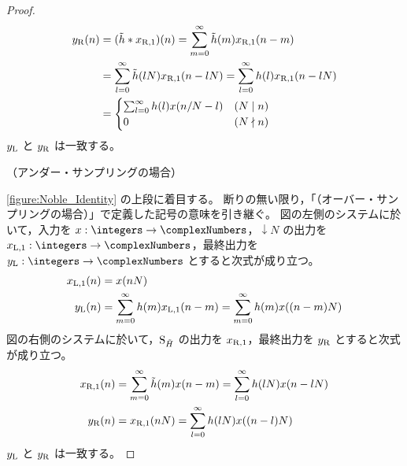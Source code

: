 \begin{proof}
\begin{align*}
                y_{\mathrm{R}}(n) &= (\tilde{h}*x_{\mathrm{R},1})(n) = \sum_{m=0}^\infty \tilde{h}(m)x_{\mathrm{R},1}(n-m) \\
                &= \sum_{l=0}^\infty \tilde{h}(lN)x_{\mathrm{R},1}(n-lN) = \sum_{l=0}^\infty h(l)x_{\mathrm{R},1}(n-lN) \\
                &= \begin{cases}
                    \sum_{l=0}^\infty h(l)x(n/N-l) & (N\mid n) \\
                    0 & (N\nmid n)
                \end{cases}
            \end{align*}
            $y_{\mathrm{L}}$ と $y_{\mathrm{R}}$ は一致する。
            \newline
            \quad\par\noindent
            （アンダー・サンプリングの場合）
            \par\noindent
            \cref{figure:Noble_Identity} の上段に着目する。
            断りの無い限り，「（オーバー・サンプリングの場合）」で定義した記号の意味を引き継ぐ。
            図の左側のシステムに於いて，入力を $x:\integers\to\complexNumbers$，$\downarrow N$ の出力を $\xLone:\integers\to\complexNumbers$，最終出力を $\yL:\integers\to\complexNumbers$ とすると次式が成り立つ。
            \begin{align*}
                x_{\mathrm{L},1}(n) &= x(nN) \\
                y_{\mathrm{L}}(n) &= \sum_{m=0}^\infty h(m)x_{\mathrm{L},1}(n-m) = \sum_{m=0}^\infty h(m)x((n-m)N)
            \end{align*}
            図の右側のシステムに於いて，$\mathrm{S}_{\tilde{H}}$ の出力を $x_{\mathrm{R},1}$，最終出力を $y_{\mathrm{R}}$ とすると次式が成り立つ。
            \begin{align*}
                x_{\mathrm{R},1}(n) &= \sum_{m=0}^\infty \tilde{h}(m)x(n-m) = \sum_{l=0}^\infty h(lN)x(n-lN) \\
                y_{\mathrm{R}}(n) &= x_{\mathrm{R},1}(nN) = \sum_{l=0}^\infty h(lN)x((n-l)N)
            \end{align*}
            $y_{\mathrm{L}}$ と $y_{\mathrm{R}}$ は一致する。
        \end{proof}
